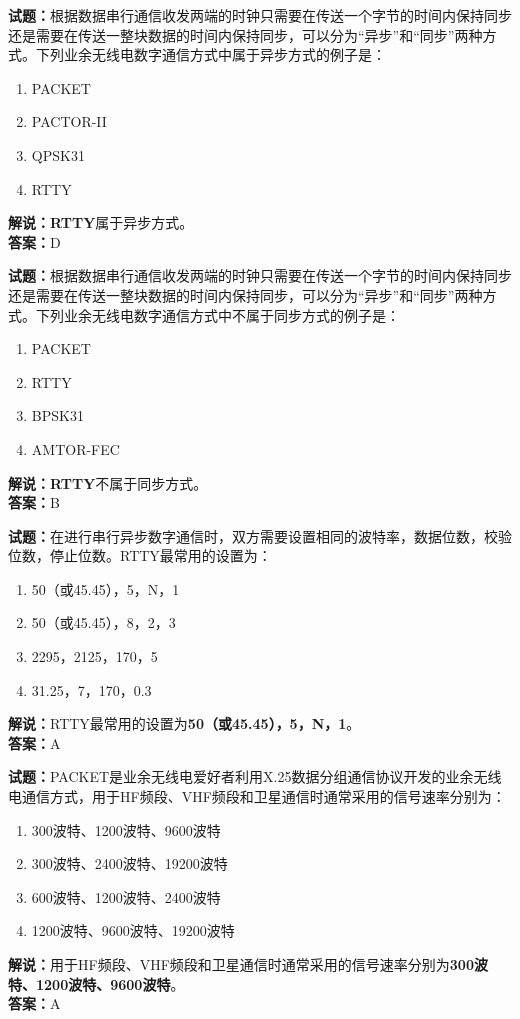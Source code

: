 \documentclass{ctexbook}
\begin{document}
\textbf{试题：}根据数据串行通信收发两端的时钟只需要在传送一个字节的时间内保持同步还是需要在传送一整块数据的时间内保持同步，可以分为“异步”和“同步”两种方式。下列业余无线电数字通信方式中属于异步方式的例子是：
\begin{enumerate}[leftmargin=3em]
  \item PACKET
  \item PACTOR-II
  \item QPSK31
  \item RTTY
\end{enumerate}
\noindent\textbf{解说：}\textbf{RTTY}属于异步方式。\\\noindent\textbf{答案：}D

\vspace{1em}

\textbf{试题：}根据数据串行通信收发两端的时钟只需要在传送一个字节的时间内保持同步还是需要在传送一整块数据的时间内保持同步，可以分为“异步”和“同步”两种方式。下列业余无线电数字通信方式中不属于同步方式的例子是：
\begin{enumerate}[leftmargin=3em]
  \item PACKET
  \item RTTY
  \item BPSK31
  \item AMTOR-FEC
\end{enumerate}
\noindent\textbf{解说：}\textbf{RTTY}不属于同步方式。\\\noindent\textbf{答案：}B

\vspace{1em}

\textbf{试题：}在进行串行异步数字通信时，双方需要设置相同的波特率，数据位数，校验位数，停止位数。RTTY最常用的设置为：
\begin{enumerate}[leftmargin=3em]
  \item 50（或45.45），5，N，1
  \item 50（或45.45），8，2，3
  \item 2295，2125，170，5
  \item 31.25，7，170，0.3
\end{enumerate}
\noindent\textbf{解说：}RTTY最常用的设置为\textbf{50（或45.45），5，N，1}。\\\noindent\textbf{答案：}A

\vspace{1em}

\textbf{试题：}PACKET是业余无线电爱好者利用X.25数据分组通信协议开发的业余无线电通信方式，用于HF频段、VHF频段和卫星通信时通常采用的信号速率分别为：
\begin{enumerate}[leftmargin=3em]
  \item 300波特、1200波特、9600波特
  \item 300波特、2400波特、19200波特
  \item 600波特、1200波特、2400波特
  \item 1200波特、9600波特、19200波特
\end{enumerate}
\noindent\textbf{解说：}用于HF频段、VHF频段和卫星通信时通常采用的信号速率分别为\textbf{300波特、1200波特、9600波特}。\\\noindent\textbf{答案：}A
\end{document}
